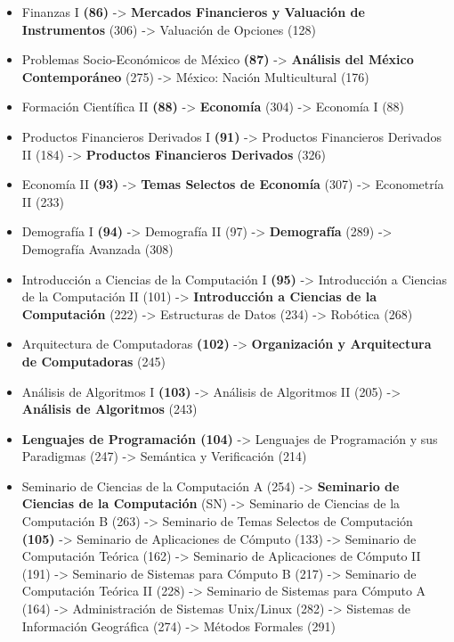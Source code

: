 \begin{appendices}
\begin{itemize}
  \item Finanzas I \textbf{(86)} -> \textbf{Mercados Financieros y Valuación de Instrumentos} (306) -> Valuación de Opciones (128)

  \item Problemas Socio-Económicos de México \textbf{(87)} -> \textbf{Análisis del México Contemporáneo} (275) -> México: Nación Multicultural (176)
  
  \item Formación Científica II \textbf{(88)} -> \textbf{Economía} (304) -> Economía I (88)

  \item Productos Financieros Derivados I \textbf{(91)} -> Productos Financieros Derivados II (184) -> \textbf{Productos Financieros Derivados} (326)
  
  \item Economía II \textbf{(93)} -> \textbf{Temas Selectos de Economía} (307) -> Econometría II (233)
  
  \item Demografía I \textbf{(94)} -> Demografía II (97) -> \textbf{Demografía} (289) -> Demografía Avanzada (308)

  \item Introducción a Ciencias de la Computación I \textbf{(95)} -> Introducción a Ciencias de la Computación II (101) -> \textbf{Introducción a Ciencias de la Computación} (222) -> Estructuras de Datos (234) -> Robótica (268)
  
  \item Arquitectura de Computadoras \textbf{(102)} -> \textbf{Organización y Arquitectura de Computadoras} (245)
  
  \item Análisis de Algoritmos I \textbf{(103)} -> Análisis de Algoritmos II (205) -> \textbf{Análisis de Algoritmos} (243)
  
  \item \textbf{Lenguajes de Programación (104)} -> Lenguajes de Programación y sus Paradigmas (247) -> Semántica y Verificación (214)
  
  \item Seminario de Ciencias de la Computación A (254) -> \textbf{Seminario de Ciencias de la Computación} (SN) -> Seminario de Ciencias de la Computación B (263) -> Seminario de Temas Selectos de Computación \textbf{(105)} -> Seminario de Aplicaciones de Cómputo (133) -> Seminario de Computación Teórica (162) -> Seminario de Aplicaciones de Cómputo II (191) -> Seminario de Sistemas para Cómputo B (217) -> Seminario de Computación Teórica II (228) -> Seminario de Sistemas para Cómputo A (164) -> Administración de Sistemas Unix/Linux (282) -> Sistemas de Información Geográfica (274) -> Métodos Formales (291)
  

\end{itemize}
\end{appendices}
